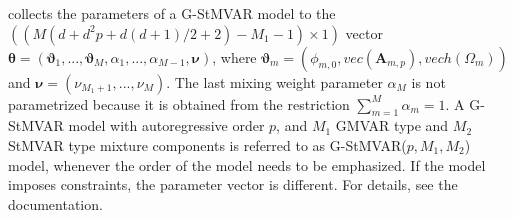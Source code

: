 \documentclass[nojss]{jss} %
\begin{document}
 collects the parameters of a G-StMVAR model to the $((M(d + d^2p + d(d+1)/2 + 2) - M_1 - 1)\times 1)$ vector $\boldsymbol{\theta}=(\boldsymbol{\vartheta}_1,...,\boldsymbol{\vartheta}_M,\alpha_1,...,\alpha_{M-1},\boldsymbol{\nu})$,  where $\boldsymbol{\vartheta}_m=(\phi_{m,0},vec(\boldsymbol{A}_{m,p}),vech(\Omega_m))$ and $\boldsymbol{\nu}=(\nu_{M_1+1},...,\nu_M)$.  The last mixing weight parameter $\alpha_M$ is not parametrized because it is obtained from the restriction $\sum_{m=1}^M \alpha_m = 1$.  A G-StMVAR model with autoregressive order $p$,  and $M_1$ GMVAR type and $M_2$ StMVAR type mixture components is referred to as G-StMVAR($p,M_1,M_2$) model, whenever the order of the model needs to be emphasized. If the model imposes constraints, the parameter vector is different. For details, see the documentation.
\end{document}
